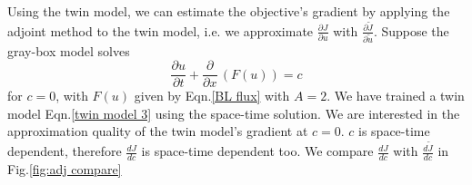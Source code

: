\documentclass{paper1}
\begin{document}
Using the twin model, we can estimate the objective's gradient by applying the
adjoint method to the twin model, i.e. we approximate
$\frac{\partial J}{\partial u}$ with $\frac{\partial \tilde{J}}{\partial \tilde{u}}$.
Suppose the gray-box model solves
\begin{equation}
    \frac{\partial u}{\partial t} + \frac{\partial}{\partial x}\,
    \left(F(u)\right) = c
\end{equation}
for $c=0$, with $F(u)$ given by Eqn.\eqref{BL flux} with $A=2$. We have trained a twin model
Eqn.\eqref{twin model 3} using the space-time solution. We are interested in
the approximation quality of the twin model's gradient at $c=0$.
$c$ is space-time dependent, therefore $\frac{dJ}{dc}$ is space-time dependent too.
We compare $\frac{dJ}{dc}$ with $\frac{d\tilde{J}}{dc}$ in Fig.\ref{fig:adj compare}
\end{document}
